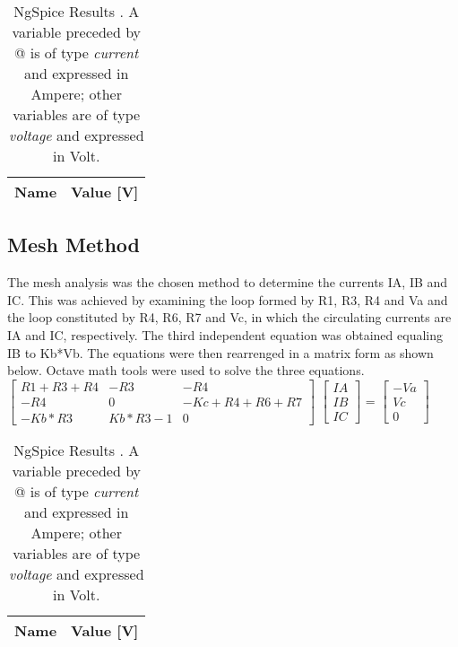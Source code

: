 \begin{table}[h]
  \centering
  \begin{tabular}{|l|r|}
    \hline    
    {\bf Name} & {\bf Value [V]} \\ \hline
    
  \end{tabular}
  \caption{NgSpice Results . A variable preceded by @ is of type {\em current}
    and expressed in Ampere; other variables are of type {\it voltage} and expressed in
    Volt.}
  \label{tab:nos}
\end{table}

\subsection{Mesh Method}
The mesh analysis was the chosen method to determine the currents IA, IB and IC. This was achieved by examining the loop formed by R1, R3, R4 and Va and the loop constituted by R4, R6, R7 and Vc, in which the circulating currents are IA and IC, respectively. The third independent equation was obtained equaling IB to Kb*Vb. The equations were then rearrenged in a matrix form as shown below. Octave math tools were used to solve the three equations.\\

$\begin{bmatrix}
R1+R3+R4 & -R3 & -R4\\
   
-R4 & 0 & -Kc+R4+R6+R7\\

-Kb*R3 & Kb*R3-1 & 0
\end{bmatrix}$
$\begin{bmatrix}
IA\\
IB\\
IC
\end{bmatrix}$
= 
$\begin{bmatrix}
-Va\\
Vc\\
0
\end{bmatrix}$

\begin{table}[h]
  \centering
  \begin{tabular}{|l|r|}
    \hline    
    {\bf Name} & {\bf Value [V]} \\ \hline
    
  \end{tabular}
  \caption{NgSpice Results . A variable preceded by @ is of type {\em current}
    and expressed in Ampere; other variables are of type {\it voltage} and expressed in
    Volt.}
  \label{tab:malhas}
\end{table}

